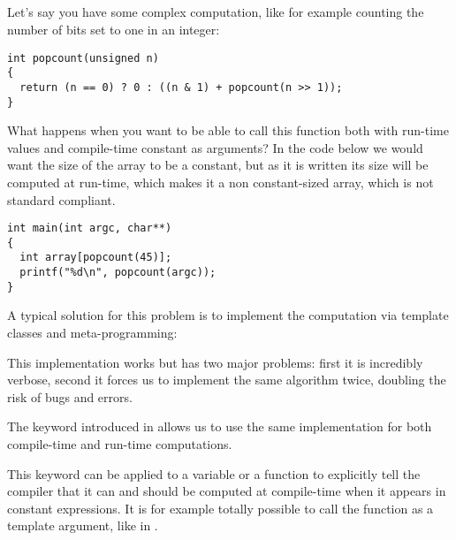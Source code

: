 \subsection{}

Let's say you have some complex computation, like for example counting
the number of bits set to one in an integer:

\begin{lstlisting}
int popcount(unsigned n)
{
  return (n == 0) ? 0 : ((n & 1) + popcount(n >> 1));
}
\end{lstlisting}

What happens when you want to be able to call this function both with
run-time values and compile-time constant as arguments? In the code
below we would want the size of the array to be a constant, but as it
is written its size will be computed at run-time, which makes it a non
constant-sized array, which is not standard compliant.

\begin{lstlisting}
int main(int argc, char**)
{
  int array[popcount(45)];
  printf("%d\n", popcount(argc));
}
\end{lstlisting}

A typical solution for this problem is to implement the computation
via template classes and meta-programming:



This implementation works but has two major problems: first it is
incredibly verbose, second it forces us to implement the same
algorithm twice, doubling the risk of bugs and errors.

\bigskip

The  keyword introduced in  allows us to use the
same implementation for both compile-time and run-time computations.



This keyword can be applied to a variable or a function to explicitly
tell the compiler that it can and should be computed at compile-time
when it appears in constant expressions. It is for example totally
possible to call the  function as a
template argument, like in .
